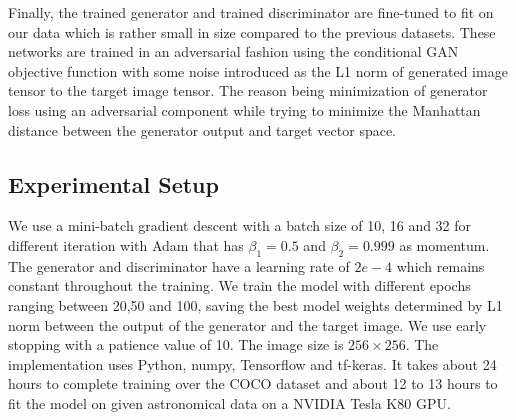 \documentclass[10pt,twocolumn,letterpaper]{article}
\begin{document}
    \hspace*{0.167 in}Finally, the trained generator and trained discriminator are fine-tuned to fit on our data which is rather small in size compared to the previous datasets. These networks are trained in an adversarial fashion using the conditional GAN objective function \cite{isola2018imagetoimage} with some noise introduced as the L1 norm of generated image tensor to the target image tensor. The reason being minimization of generator loss using an adversarial component while trying to minimize the Manhattan distance between the generator output and target vector space.
\subsection{Experimental Setup}
    \hspace*{0.167 in}We use a mini-batch gradient descent with a batch size of 10, 16 and 32 for different iteration with Adam that has $\beta_1 = 0.5$ and $\beta_2 = 0.999$ as momentum. The generator and discriminator have a learning rate of $2e-4$ which remains constant throughout the training. We train the model with different epochs ranging between 20,50 and 100, saving the best model weights determined by L1 norm between the output of the generator and the target image. We use early stopping with a patience value of 10. The image size is $256\times256$. The implementation uses Python, numpy, Tensorflow and tf-keras. It takes about 24 hours to complete training over the COCO dataset and about 12 to 13 hours to fit the model on given astronomical data on a NVIDIA Tesla K80 GPU.
    
\end{document}
